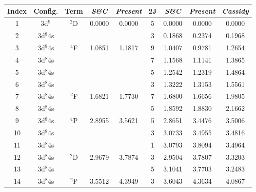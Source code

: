 \begin{table}[hbt]
\footnotesize
\begin{center}
\begin{tabular}{@{}        c c c c         c c c c c        @{}}
\toprule
\multicolumn{1}{c}{Index} & \multicolumn{1}{c}{Config.} & \multicolumn{1}{c}{Term} & \multicolumn{1}{c}{\textit{S\&C}} & \multicolumn{1}{c}{\textit{Present}} & \multicolumn{1}{c}{2J} & \multicolumn{1}{c}{\textit{S\&C}} & \multicolumn{1}{c}{\textit{Present}} & \multicolumn{1}{c}{\textit{Cassidy}} \\  

\toprule
                                            
                                           
\multicolumn{1}{c}{1} &  3d$^9$  & $^2$D  & 0.0000   & 0.0000 &  5 &   0.0000  &  0.0000 &  0.0000\\
\multicolumn{1}{c}{2} &  3d$^8$4s  &               &  &   &   3 &   0.1868  & 0.2374 &  0.1968\\
\multicolumn{1}{c}{3} &  3d$^8$4s  & $^4$F  &   1.0851  & 1.1817  &  9 &   1.0407 &  0.9781 &  1.2654\\
\multicolumn{1}{c}{4} &  3d$^8$4s  &               &    &   &  7 &   1.1568   & 1.1141 &  1.3865\\
\multicolumn{1}{c}{5} &  3d$^8$4s  &               &    &  &  5 &  1.2542   & 1.2319 &  1.4864\\
\multicolumn{1}{c}{6} &  3d$^8$4s  &               &    &   &  3 &   1.3222  &  1.3153 &  1.5561\\
\multicolumn{1}{c}{7} &  3d$^8$4s  & $^2$F  &  1.6821  & 1.7730  &  7 &  1.6800  &  1.6656 &  1.9805\\
\multicolumn{1}{c}{8} &  3d$^8$4s  &                &   & &  5 &   1.8592 &  1.8830 &  2.1662\\
\multicolumn{1}{c}{9} &  3d$^8$4s  & $^4$P  &  2.8955     &  3.5621 &  5 &  2.8651 &  3.4476 &  3.5006\\
\multicolumn{1}{c}{10} &  3d$^8$4s &                &   &  &  3 &   3.0733  &  3.4955 &  3.4816\\
\multicolumn{1}{c}{11} &  3d$^8$4s  &                &    &   &  1 &   3.0793  &  3.8094 & 3.4964\\
\multicolumn{1}{c}{12} &  3d$^8$4s  & $^2$D  &  2.9679    &  3.7874 &  3 &    2.9504  & 3.7807 &  3.3203\\
\multicolumn{1}{c}{13} &  3d$^8$4s  &                 &    &   &  5 &    3.1041  &  3.7703 &  3.2483\\
\multicolumn{1}{c}{14} &  3d$^8$4s  & $^2$P  & 3.5512 &  4.3949 &  3 &   3.6043  &  4.3634 &  4.0867\\

\end{tabular}
\end{center}
\end{table}
